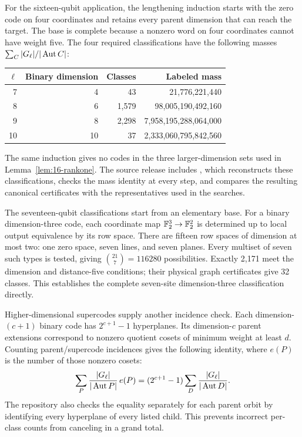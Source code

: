 For the sixteen-qubit application, the lengthening induction starts with
the zero code on four coordinates and retains every parent dimension
that can reach the target. The base is complete because a nonzero word
on four coordinates cannot have weight five. The four required classifications have the
following masses \(\sum_C |G_\ell|/|\operatorname{Aut} C|\):
\begin{center}\small
\begin{tabular}{@{}rrrr@{}}\toprule
\(\ell\)&Binary dimension&Classes&Labeled mass\\\midrule
7&4&43&21,776,221,440\\
8&6&1,579&98,005,190,492,160\\
9&8&2,298&7,958,195,288,064,000\\
10&10&37&2,333,060,795,842,560\\\bottomrule
\end{tabular}
\end{center}
The same induction gives no codes in the three larger-dimension sets
used in Lemma~\ref{lem:16-rankone}. The source release includes
, which reconstructs these classifications,
checks the mass identity at every step, and compares the resulting
canonical certificates with the representatives used in the searches.

The seventeen-qubit classifications start from an elementary base.
For a binary dimension-three code, each coordinate map
\(\mathbb F_2^3\to\mathbb F_2^2\) is determined up to local output equivalence by its
row space. There are fifteen row spaces of dimension at most two:
one zero space, seven lines, and seven planes.
Every multiset of seven such types is tested, giving
\(\binom{21}{7}=116280\) possibilities. Exactly 2,171 meet the
dimension and distance-five conditions; their physical graph certificates
give 32 classes. This establishes the complete seven-site dimension-three
classification directly.

Higher-dimensional supercodes supply another incidence check. Each
dimension-\((c+1)\) binary code has \(2^{c+1}-1\) hyperplanes.
Its dimension-\(c\) parent extensions correspond to nonzero quotient
cosets of minimum weight at least \(d\). Counting parent/supercode
incidences gives the following identity, where \(e(P)\) is the number
of those nonzero cosets:
\begin{equation}\label{eq:incidence}
 \sum_P\frac{|G_\ell|}{|\operatorname{Aut} P|}\,e(P)
 =(2^{c+1}-1)\sum_D\frac{|G_\ell|}{|\operatorname{Aut} D|}.
\end{equation}
The repository also checks the equality separately for each parent orbit
by identifying every hyperplane of every listed child. This prevents
incorrect per-class counts from canceling in a grand total.

